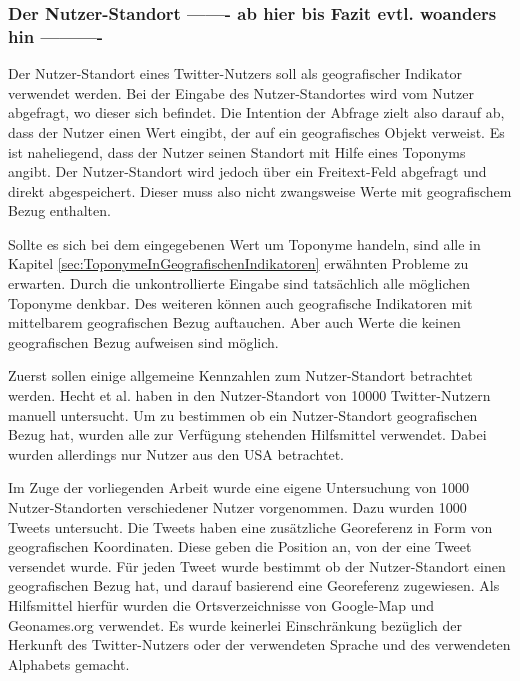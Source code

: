 			\subsubsection{Der Nutzer-Standort ------- ab hier bis Fazit evtl. woanders hin ----------} \label{subsec:nutzerStandort} 

				Der Nutzer-Standort eines Twitter-Nutzers soll als geografischer Indikator verwendet werden.
				Bei der Eingabe des Nutzer-Standortes wird vom Nutzer abgefragt, wo dieser sich befindet. 
				Die Intention der Abfrage zielt also darauf ab, dass der Nutzer einen Wert eingibt, der auf ein geografisches Objekt verweist. 
				Es ist naheliegend, dass der Nutzer seinen Standort mit Hilfe eines Toponyms angibt.
				Der Nutzer-Standort wird jedoch über ein Freitext-Feld abgefragt und direkt abgespeichert.
				Dieser muss also nicht zwangsweise Werte mit geografischem Bezug enthalten. 

				Sollte es sich bei dem eingegebenen Wert um Toponyme handeln, sind alle in Kapitel \ref{sec:ToponymeInGeografischenIndikatoren} erwähnten Probleme zu erwarten.
				Durch die unkontrollierte Eingabe sind tatsächlich alle möglichen Toponyme denkbar.
				Des weiteren können auch geografische Indikatoren mit mittelbarem geografischen Bezug auftauchen.
				Aber auch Werte die keinen geografischen Bezug aufweisen sind möglich.	

				Zuerst sollen einige allgemeine Kennzahlen zum Nutzer-Standort betrachtet werden.
				Hecht et al. haben in \cite{Hecht2011} den Nutzer-Standort von 10000 Twitter-Nutzern manuell untersucht.
				Um zu bestimmen ob ein Nutzer-Standort geografischen Bezug hat, wurden alle zur Verfügung stehenden Hilfsmittel verwendet.
				Dabei wurden allerdings nur Nutzer aus den USA betrachtet.

				Im Zuge der vorliegenden Arbeit wurde eine eigene Untersuchung von 1000 Nutzer-Standorten verschiedener Nutzer vorgenommen.
				Dazu wurden 1000 Tweets untersucht.
				Die Tweets haben eine zusätzliche Georeferenz in Form von geografischen Koordinaten.
				Diese geben die Position an, von der eine Tweet versendet wurde.
				Für jeden Tweet wurde bestimmt ob der Nutzer-Standort einen geografischen Bezug hat, und darauf basierend eine Georeferenz zugewiesen.
				Als Hilfsmittel hierfür wurden die Ortsverzeichnisse von Google-Map und Geonames.org verwendet.
				Es wurde keinerlei Einschränkung bezüglich der Herkunft des Twitter-Nutzers oder der verwendeten Sprache und des verwendeten Alphabets gemacht.

